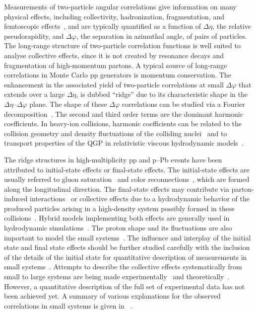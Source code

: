 Measurements of two-particle angular correlations give information on many physical effects, including collectivity, hadronization, fragmentation, and femtoscopic effects~\cite{Lisa:2005dd}, and are typically quantified as a function of $\Delta\eta$, the relative pseudorapidity, and $\Delta\varphi$, the separation in azimuthal angle, of pairs of particles. The long-range structure of two-particle correlation functions is well suited to analyse collective effects, since it is not created by resonance decays and fragmentation of high-momentum partons. A typical source of long-range correlations in Monte Carlo pp generators is momentum conservation. %
The enhancement in the associated yield of two-particle correlations at small $\Delta\varphi$ that extends over a large $\Delta\eta$, is dubbed ``ridge'' due to its characteristic shape in the $\Delta\eta$--$\Delta\varphi$ plane.
The shape of these $\Delta\varphi$ correlations can be studied via a Fourier decomposition~\cite{Poskanzer:1998yz,Voloshin:2008dg}. The second and third order terms are the dominant harmonic coefficients. In heavy-ion collisions, harmonic coefficients can be related to the collision geometry and density fluctuations of the colliding nuclei~\cite{Alver:2010gr,Alver:2010dn,ALICE:2011ab} and to transport properties of the QGP in relativistic viscous hydrodynamic models~\cite{Gale:2012rq,Niemi:2015qia,Shen:2014vra,Bernhard:2016tnd,Bernhard2019}.

The ridge structures in high-multiplicity pp and p--Pb events have been attributed to initial-state effects or final-state effects. The initial-state effects are usually referred to gluon saturation~\cite{Dusling:2012cg,Bzdak:2013zma} and color reconnections~\cite{Ortiz:2013yxa,Sarma:2019teo}, which are formed along the longitudinal direction. The final-state effects may contribute via parton-induced interactions~\cite{Arbuzov:2011yr} or collective effects due to a hydrodynamic behavior of the produced particles arising in a high-density system possibly formed in these collisions~\cite{Weller:2017tsr,Zhao:2017rgg}. 
Hybrid models implementing both effects are generally used in hydrodynamic simulations~\cite{Greif:2017bnr,Mantysaari:2017cni}. 
The proton shape and its fluctuations are also important to model the small systems~\cite{Mantysaari:2017cni}.
The influence and interplay of the initial state and final state effects should be further studied carefully with the inclusion of  the details of the initial state for quantitative description of measurements in small systems~\cite{Schenke:2019pmk,Schenke:2020mbo}. 
Attempts to describe the collective effects systematically from small to large systems are being made experimentally~\cite{Acharya:2019vdf} and theoretically~\cite{Schenke:2020mbo}.
However, a quantitative description of the full set of experimental data has not been achieved yet.
A summary of various explanations for the observed correlations in small systems is given in ~\cite{Strickland:2018exs,Loizides:2016tew,Nagle:2018nvi}.

